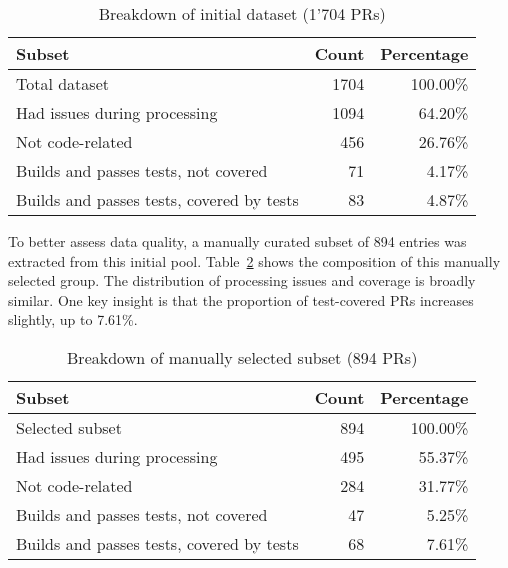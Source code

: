 \begin{table}[ht]
	\centering
	\begin{tabular}{lrr}
		\toprule
		\textbf{Subset}                                        & \textbf{Count} & \textbf{Percentage} \\
		\midrule
		Total dataset                                          & 1704           & 100.00\%            \\
		Had issues during processing                           & 1094           & 64.20\%             \\
		Not code-related                                       & 456            & 26.76\%             \\
		Builds and passes tests, not covered                   & 71             & 4.17\%              \\
		Builds and passes tests, covered by tests\footnotemark & 83             & 4.87\%              \\
		\bottomrule
	\end{tabular}
	\caption{Breakdown of initial dataset (1'704 PRs)}
	\label{tab:initial-distribution}
\end{table}


To better assess data quality, a manually curated subset of 894 entries was extracted from this
initial pool. Table~\ref{tab:manual-selection-distribution} shows the composition of this manually
selected group. The distribution of processing issues and coverage is broadly similar. One key
insight is that the proportion of test-covered PRs increases slightly, up to 7.61\%.

\begin{table}[ht]
	\centering
	\begin{tabular}{lrr}
		\toprule
		\textbf{Subset}                           & \textbf{Count} & \textbf{Percentage} \\
		\midrule
		Selected subset                           & 894            & 100.00\%            \\
		Had issues during processing              & 495            & 55.37\%             \\
		Not code-related                          & 284            & 31.77\%             \\
		Builds and passes tests, not covered      & 47             & 5.25\%              \\
		Builds and passes tests, covered by tests & 68             & 7.61\%              \\
		\bottomrule
	\end{tabular}
	\caption{Breakdown of manually selected subset (894 PRs)}
	\label{tab:manual-selection-distribution}
\end{table}

